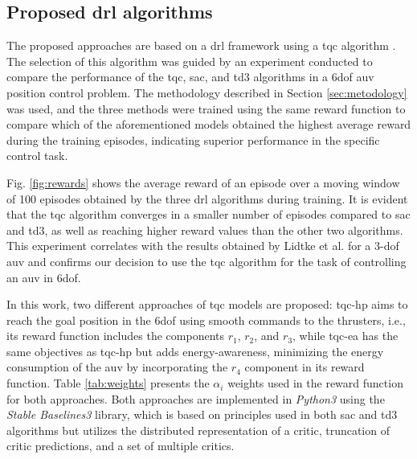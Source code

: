\subsection{Proposed \ac{drl} algorithms}

The proposed approaches are based on a \ac{drl} framework using a \ac{tqc} algorithm \cite{kuznetsov2020}. The selection of this algorithm was guided by an experiment conducted to compare the performance of the \ac{tqc}, \ac{sac}, and \ac{td3} algorithms in a \ac{6dof} \ac{auv} position control problem. The methodology described in Section \ref{sec:metodology} was used, and the three methods were trained using the same reward function to compare which of the aforementioned models obtained the highest average reward during the training episodes, indicating superior performance in the specific control task.

Fig. \ref{fig:rewards} shows the average reward of an episode over a moving window of 100 episodes obtained by the three \ac{drl} algorithms during training. It is evident that the \ac{tqc} algorithm converges in a smaller number of episodes compared to \ac{sac} and \ac{td3}, as well as reaching higher reward values than the other two algorithms. This experiment correlates with the results obtained by Lidtke et al. \cite{lidtke2024} for a 3-\acs{dof} \ac{auv} and confirms our decision to use the \ac{tqc} algorithm for the task of controlling an \ac{auv} in \ac{6dof}.

In this work, two different approaches of \ac{tqc} models are proposed: \ac{tqc-hp} aims to reach the goal position in the \ac{6dof} using smooth commands to the thrusters, i.e., its reward function includes the components $r_1$, $r_2$, and $r_3$, while \ac{tqc-ea} has the same objectives as \ac{tqc-hp} but adds energy-awareness, minimizing the energy consumption of the \ac{auv} by incorporating the $r_4$ component in its reward function. Table \ref{tab:weights} presents the $\alpha_i$ weights used in the reward function for both approaches. Both approaches are implemented in \textit{Python3} using the \textit{Stable Baselines3} library, which is based on principles used in both \ac{sac} and \ac{td3} algorithms but utilizes the distributed representation of a critic, truncation of critic predictions, and a set of multiple critics.
